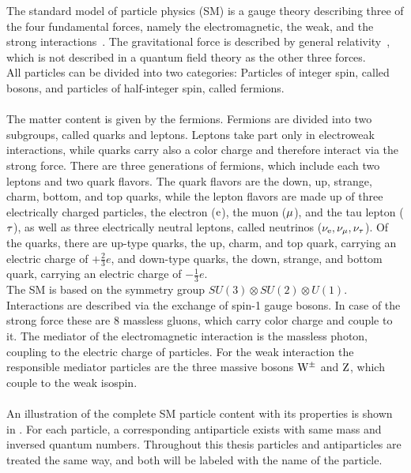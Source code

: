 The standard model of particle physics (SM) is a gauge theory describing three of the four fundamental forces, namely the electromagnetic, the weak, and the strong interactions~\cite{SM}. The gravitational force is described by general relativity~\cite{Einstein}, which is not described in a quantum field theory as the other three forces.\\
All particles can be divided into two categories: Particles of integer spin, called bosons, and particles of half-integer spin, called fermions.\\\\
The matter content is given by the fermions. Fermions are divided into two subgroups, called quarks and leptons. Leptons take part only in electroweak interactions, while quarks carry also a color charge and therefore interact via the strong force. There are three generations of fermions, which include each two leptons and two quark flavors. The quark flavors are the down, up, strange, charm, bottom, and top quarks, while the lepton flavors are made up of three electrically charged particles, the electron ($\mathrm{e}$), the muon ($\mu$), and the tau lepton ($\tau$), as well as three electrically neutral leptons, called neutrinos ($\nu_\mathrm{{e}},\nu_{\mu},\nu_{\tau}$).
Of the quarks, there are up-type quarks, the up, charm, and top quark, carrying an electric charge of $+\frac{2}{3}e$, and down-type quarks, the down, strange, and bottom quark, carrying an electric charge of $-\frac{1}{3}e$.\\
The SM is based on the symmetry group $SU(3)\otimes SU(2)\otimes U(1)$. Interactions are described via the exchange of spin-1 gauge bosons. In case of the strong force these are 8 massless gluons, which carry color charge and couple to it. The mediator of the electromagnetic interaction is the massless photon, coupling to the electric charge of particles. For the weak interaction the responsible mediator particles are the three massive bosons $\mathrm{W}^\pm$ and $\mathrm{Z}$, which couple to the weak isospin.\\\\
An illustration of the complete SM particle content with its properties is shown in .
For each particle, a corresponding antiparticle exists with same mass and inversed quantum numbers. Throughout this thesis particles and antiparticles are treated the same way, and both will be labeled with the name of the particle.\\

